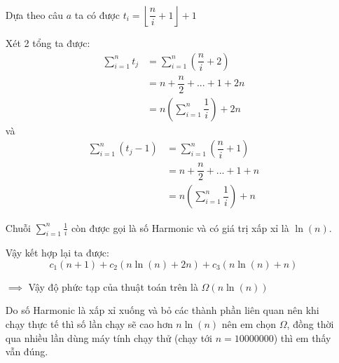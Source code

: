\documentclass[12pt]{article}
\begin{document}
\begin{itemize}
    \item[] Dựa theo câu $a$ ta có được $t_i = \left \lfloor \dfrac{n}{i} + 1 \right \rfloor + 1$

    \item[] Xét 2 tổng ta được:
    $$
    \begin{aligned}
    \sum_{i=1}^n t_j &= \sum_{i=1}^n \left( \dfrac{n}{i} + 2 \right) \\
    &= n + \dfrac{n}{2} + ... + 1 + 2n \\
    &= n \left(\sum_{i=1}^n \dfrac{1}{i} \right) + 2n
    \end{aligned}
    $$
    và  
    $$
    \begin{aligned}
    \sum_{i=1}^n (t_j - 1) &= \sum_{i=1}^n \left( \dfrac{n}{i} + 1 \right) \\
    &= n + \dfrac{n}{2} + ... + 1 + n \\
    &= n \left( \sum_{i=1}^n \dfrac{1}{i} \right) + n
    \end{aligned}
    $$

    \item[] Chuỗi $\displaystyle \sum_{i=1}^n \frac{1}{i}$ còn được gọi là số Harmonic và có giá trị xấp xỉ là $\ln(n)$.

    \item[] Vậy kết hợp lại ta được:
    $$
    c_1(n+1) + c_2(n\ln(n) + 2n) + c_3(n\ln(n) + n)
    $$

    \item[$\implies$] Vậy độ phức tạp của thuật toán trên là $\Omega(n\ln(n))$ 
    
    \begin{note}
    Do số Harmonic là xấp xỉ xuống và bỏ các thành phần liên quan nên khi chạy thực tế thì số lần chạy sẽ cao hơn $n\ln(n)$ nên em chọn $\Omega$, đồng thời qua nhiều lần dùng máy tính chạy thử (chạy tới $n = 10000000$) thì em thấy vẫn đúng.
    \end{note}
\end{itemize}
\vspace*{10pt}
\end{document}
